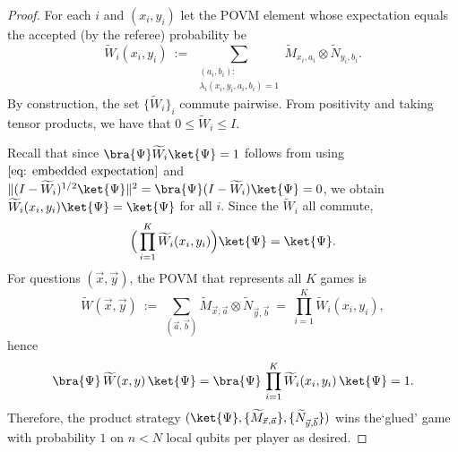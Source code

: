 \documentclass{article}
\begin{document}
\begin{proof}
    For each $i$ and $(x_i,y_i)$ let the POVM element whose expectation equals the accepted (by the referee) probability be 
    \begin{equation}
        \widetilde W_i(x_i,y_i)\ :=\ \sum_{\substack{(a_i,b_i): \\\lambda_i(x_i,y_i,a_i,b_i)=1}} \widetilde M_{x_i,a_i}\otimes \widetilde N_{y_i,b_i}.
    \end{equation}
    By construction, the set $\{\widetilde W_i\}_i$ commute pairwise. From positivity and taking tensor products, we have that $0\le \widetilde W_i\le I$. 
    
    
    Recall that since $\bra{\Psi} \widetilde W_i\ket{\Psi}=1$ follows from  using $\Cref{eq: embedded expectation}$ and $\| (I-\widetilde W_i)^{1/2}\ket{\Psi}\|^2=\bra{\Psi}(I-\widetilde W_i)\ket{\Psi}=0$, we obtain $\widetilde W_i(x_i,y_i)\ket{\Psi}=\ket{\Psi}$ for all $i$. Since the $\widetilde W_i$ all commute,
    \begin{equation}
        \Big(\prod_{i=1}^K \widetilde W_i(x_i,y_i)\Big)\ket{\Psi}=\ket{\Psi}.
    \end{equation}
   For questions $(\vec{x},\vec{y})$, the POVM that represents all $K$ games is 
    \begin{equation}
        \widetilde W(\vec{x},\vec{y})\ :=\ \sum_{(\vec{a},\vec{b})}
        \widetilde M_{\vec{x},\vec{a}}\otimes \widetilde N_{\vec{y},\vec{b}}
        \ =\ \prod_{i=1}^K \widetilde W_i(x_i,y_i),
    \end{equation}
    hence
    \begin{equation}
        \bra{\Psi}\,\widetilde W(x,y)\,\ket{\Psi}
        =\bra{\Psi}\,\prod_{i=1}^K \widetilde W_i(x_i,y_i)\,\ket{\Psi}
        =1.
    \end{equation}
    Therefore, the product strategy $(\ket{\Psi},\{\widetilde M_{\vec{x},\vec{a}}\},\{\widetilde N_{\vec{y},\vec{b}}\})$ wins the`glued' game with probability $1$ on $n<N$ local qubits per player as desired.
    \end{proof}
\end{document}

